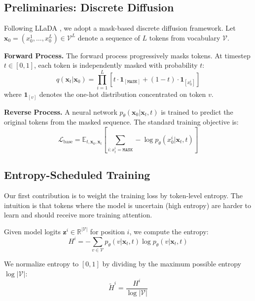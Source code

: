 \documentclass[conference]{IEEEtran}
\begin{document}
\subsection{Preliminaries: Discrete Diffusion}

Following LLaDA \cite{nie2025llada}, we adopt a mask-based discrete diffusion framework. Let $\mathbf{x}_0 = (x_0^1, \ldots, x_0^L) \in \mathcal{V}^L$ denote a sequence of $L$ tokens from vocabulary $\mathcal{V}$.

\textbf{Forward Process.} The forward process progressively masks tokens. At timestep $t \in [0, 1]$, each token is independently masked with probability $t$:
\begin{equation}
    q(\mathbf{x}_t | \mathbf{x}_0) = \prod_{i=1}^{L} \left[ t \cdot \mathbf{1}_{[\texttt{MASK}]} + (1-t) \cdot \mathbf{1}_{[x_0^i]} \right]
\end{equation}
where $\mathbf{1}_{[v]}$ denotes the one-hot distribution concentrated on token $v$.

\textbf{Reverse Process.} A neural network $p_\theta(\mathbf{x}_0 | \mathbf{x}_t, t)$ is trained to predict the original tokens from the masked sequence. The standard training objective is:
\begin{equation}
    \mathcal{L}_{\text{base}} = \mathbb{E}_{t, \mathbf{x}_0, \mathbf{x}_t} \left[ \sum_{i: x_t^i = \texttt{MASK}} -\log p_\theta(x_0^i | \mathbf{x}_t, t) \right]
\end{equation}

\subsection{Entropy-Scheduled Training}

Our first contribution is to weight the training loss by token-level entropy. The intuition is that tokens where the model is uncertain (high entropy) are harder to learn and should receive more training attention.

Given model logits $\mathbf{z}^i \in \mathbb{R}^{|\mathcal{V}|}$ for position $i$, we compute the entropy:
\begin{equation}
    H^i = -\sum_{v \in \mathcal{V}} p_\theta(v | \mathbf{x}_t, t) \log p_\theta(v | \mathbf{x}_t, t)
\end{equation}

We normalize entropy to $[0, 1]$ by dividing by the maximum possible entropy $\log |\mathcal{V}|$:
\begin{equation}
    \tilde{H}^i = \frac{H^i}{\log |\mathcal{V}|}
\end{equation}
\end{document}
